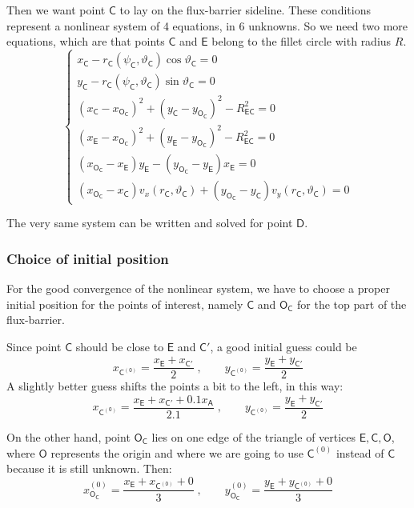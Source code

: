 \documentclass[b5paper,11pt,oneside,fleqn]{article}
\newcommand{\pt}[1]{\mathsf{#1}}
\newcommand{\te}{\vartheta}
\begin{document}
Then we want point $ \pt{C} $ to lay on the flux-barrier sideline. These
conditions represent a nonlinear system of 4 equations, in 6 unknowns.
So we need two more equations, which are that points $ \pt{C} $ and $ \pt{E} $
belong to the fillet circle with radius $ R $.
\begin{equation}
\begin{cases}
x_\pt{C} - r_\pt{C}(\psi_\pt{C}, \te_\pt{C}) \cos\te_\pt{C} = 0 \\
y_\pt{C} - r_\pt{C}(\psi_\pt{C}, \te_\pt{C}) \sin\te_\pt{C} = 0 \\
%
(x_\pt{C} - x_\pt{O_\pt{C}})^2 + (y_\pt{C} - y_\pt{O_\pt{C}})^2
- R_\pt{EC}^2 = 0 \\
(x_\pt{E} - x_\pt{O_\pt{C}})^2 + (y_\pt{E} - y_\pt{O_\pt{C}})^2
- R_\pt{EC}^2 = 0 \\
%
(x_\pt{O_\pt{C}} - x_\pt{E}) y_\pt{E} -
(y_\pt{O_\pt{C}} - y_\pt{E}) x_\pt{E} = 0 \\
%
(x_\pt{O_\pt{C}} - x_\pt{C}) v_x(r_\pt{C},\te_\pt{C}) +
(y_\pt{O_\pt{C}} - y_\pt{C}) v_y(r_\pt{C},\te_\pt{C}) = 0
\end{cases}
\end{equation}

The very same system can be written and solved for point $ \pt{D} $.


\subsubsection{Choice of initial position}

For the good convergence of the nonlinear system, we have to choose a proper 
initial position for the points of interest, namely $ \pt{C} $ and 
$ \pt{O}_\pt{C} $ for the top part of the flux-barrier.

Since point $ \pt{C} $ should be close to $ \pt{E} $ and $ \pt{C}' $, 
a good initial guess could be
\begin{equation}
x_\pt{C^{(0)}} = \frac{x_\pt{E} + x_{\pt{C}'}}{2} \;,  \qquad
y_\pt{C^{(0)}} = \frac{y_\pt{E} + y_{\pt{C}'}}{2} 
\end{equation}
A slightly better guess shifts the points a bit to the left, in this way:
\begin{equation}
x_\pt{C^{(0)}} = \frac{x_\pt{E} + x_{\pt{C}'} + 0.1 x_\pt{A}}{2.1} \;,  \qquad
y_\pt{C^{(0)}} = \frac{y_\pt{E} + y_{\pt{C}'}}{2} 
\end{equation}

On the other hand, point $ \pt{O}_\pt{C} $ lies on one edge of the triangle of 
vertices
$ \pt{E},\pt{C},\pt{O} $, where $ \pt{O} $ represents the origin and where we 
are going to use $ \pt{C}^{(0)} $ instead of $ \pt{C} $ because it is still 
unknown. Then:
\begin{equation}
x_\pt{O_\pt{C}}^{(0)} = \frac{x_\pt{E} + x_\pt{C^{(0)}} + 0}{3} \;,  \qquad
y_\pt{O_\pt{C}}^{(0)} = \frac{y_\pt{E} + y_\pt{C^{(0)}} + 0}{3} 
\end{equation}
\end{document}
